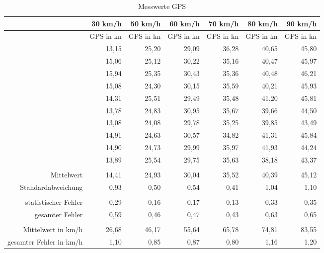 \begin{table}[htbp]
  \centering
  \caption{Messwerte GPS}
    \begin{tabular}{rrrrrrr}
    \toprule
          & 30 km/h & 50 km/h & 60 km/h & 70 km/h & 80 km/h & 90 km/h \\
    \midrule
          & GPS in kn & GPS in kn & GPS in kn & GPS in kn & GPS in kn & GPS in kn \\
          & 13,15 & 25,20  & 29,09 & 36,28 & 40,65 & 45,80 \\
          & 15,06 & 25,12 & 30,22 & 35,16 & 40,47 & 45,97 \\
          & 15,94 & 25,35 & 30,43 & 35,36 & 40,48 & 46,21 \\
          & 15,08 & 24,30  & 30,15 & 35,59 & 40,21 & 45,93 \\
          & 14,31 & 25,51 & 29,49 & 35,48 & 41,20  & 45,81 \\
          & 13,78 & 24,83 & 30,95 & 35,67 & 39,66 & 44,50 \\
          & 13,08 & 24,08 & 29,78 & 35,25 & 39,85 & 43,49 \\
          & 14,91 & 24,63 & 30,57 & 34,82 & 41,31 & 45,84 \\
          & 14,90  & 24,73 & 29,99 & 35,97 & 41,93 & 44,24 \\
          & 13,89 & 25,54 & 29,75 & 35,63 & 38,18 & 43,37 \\
          &       &       &       &       &       &  \\
    Mittelwert & 14,41 & 24,93 & 30,04 & 35,52 & 40,39 & 45,12 \\
    Standardabweichung & 0,93 & 0,50 & 0,54 & 0,41 & 1,04 & 1,10 \\
          &       &       &       &       &       &  \\
    statistischer Fehler & 0,29 & 0,16 & 0,17 & 0,13 & 0,33 & 0,35 \\
    gesamter Fehler & 0,59 & 0,46 & 0,47 & 0,43 & 0,63 & 0,65 \\
          &       &       &       &       &       &  \\
    Mittelwert in km/h & 26,68 & 46,17 & 55,64 & 65,78 & 74,81 & 83,55 \\
    gesamter Fehler in km/h & 1,10 & 0,85 & 0,87 & 0,80 & 1,16 & 1,20 \\
    \bottomrule
    \end{tabular}%
  \label{tab:GPS}%
\end{table}%

